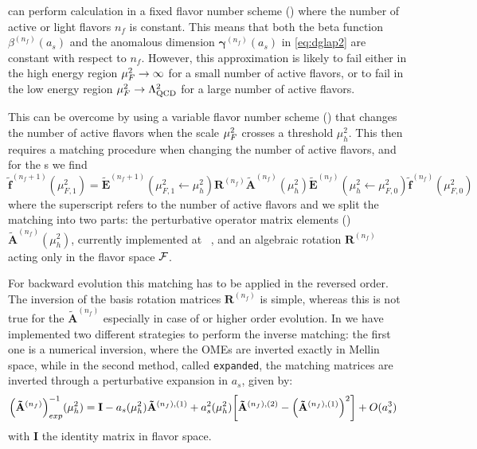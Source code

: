 \eko{} can perform calculation in a fixed flavor number scheme (\ffns{}) where
the number of active or light flavors $n_f$ is constant. This means that both
the beta function $\beta^{(n_f)}(a_s)$ and the anomalous dimension
$\bm{\gamma}^{(n_f)}(a_s)$ in \cref{eq:dglap2} are constant with respect to
$n_f$.
However, this approximation is likely to fail either in the high energy region
$\mu_F^2 \to \infty$ for a small number of active flavors, or to fail in the low
energy region $\mu_F^2 \to \Lambda_{\text{QCD}}^2$ for a large number of active
flavors.

This can be overcome by using a variable flavor number scheme (\vfns{}) that
changes the number of active flavors when the scale $\mu_F^2$ crosses a
threshold $\mu_h^2$.
This then requires a matching procedure when changing the number of active
flavors, and for the \pdf{}s we find
\begin{equation}
    \tilde{\mathbf{f}}^{(n_f+1)}(\mu_{F,1}^2)= \tilde{\mathbf{E}}^{(n_f+1)}(\mu_{F,1}^2\leftarrow \mu_{h}^2) {\mathbf{R}^{(n_f)}} \tilde{\mathbf{A}}^{(n_f)}(\mu_{h}^2) \tilde{\mathbf{E}}^{(n_f)}(\mu_{h}^2\leftarrow \mu_{F,0}^2) \tilde{\mathbf{f}}^{(n_f)}(\mu_{F,0}^2)
    \label{eq:matching}
\end{equation}
where the superscript refers to the number of active flavors and we split the matching into two
parts: the perturbative operator matrix elements (\ome{}) $\tilde{\mathbf{A}}^{(n_f)}(\mu_{h}^2)$,
currently implemented at \nnlo{}~\cite{Buza_1998}, and an algebraic rotation ${\mathbf{R}^{(n_f)}}$ acting
only in the flavor space $\mathcal{F}$.

For backward evolution this matching has to be applied in the reversed order.
The inversion of the basis rotation matrices $\mathbf{R}^{(n_f)}$ is simple,
whereas this is not true for the \ome{} $\mathbf{\tilde A}^{(n_f)}$ especially
in case of \nnlo{} or higher order evolution.
In \eko{} we have implemented two different strategies to perform the inverse
matching: the first one is a numerical inversion, where the OMEs are inverted
exactly in Mellin space, while in the second method, called \texttt{expanded},
the matching matrices are inverted through a perturbative expansion in $a_s$,
given by:
\begin{align}
    \qty(\mathbf{\tilde A}^{(n_f)})_{exp}^{-1}(\mu_{h}^2) &= \mathbf{I} - a_s(\mu_{h}^2) \mathbf{\tilde A}^{(n_f),(1)} + a_s^2(\mu_{h}^2) \qty[ \mathbf{\tilde A}^{(n_f),(2)} - \qty(\mathbf{\tilde A}^{(n_f),(1)})^2 ] + O(a_s^3)
    \label{eq:invmatchingexp}
\end{align}
with $\mathbf{I}$ the identity matrix in flavor space.

